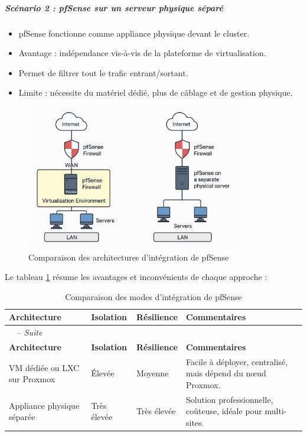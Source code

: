 \subparagraph{Scénario 2 : pfSense sur un serveur physique séparé}

\begin{itemize}
	\item pfSense fonctionne comme appliance physique devant le cluster.
	\item Avantage : indépendance vis-à-vis de la plateforme de virtualisation.
	\item Permet de filtrer tout le trafic entrant/sortant.
	\item Limite : nécessite du matériel dédié, plus de câblage et de gestion physique.
\end{itemize}

\begin{figure}[H]
	\centering
	\includegraphics[width=0.85\textwidth]{figures/choix implementation pfsense.png}
	\caption{Comparaison des architectures d'intégration de pfSense}
\end{figure}

Le tableau \ref{tab:pfsense_arch} résume les avantages et inconvénients de chaque approche :

\begin{longtable}{|p{4.5cm}|p{3.5cm}|p{3cm}|p{3.5cm}|}
	\caption{Comparaison des modes d’intégration de pfSense}
	\label{tab:pfsense_arch}                                                                                                               \\ \hline
	\textbf{Architecture}        & \textbf{Isolation} & \textbf{Résilience} & \textbf{Commentaires}                                        \\ \hline
	\endfirsthead
	\multicolumn{4}{l}{\tablename\ \thetable\ -- \textit{Suite}}                                                                           \\ \hline
	\textbf{Architecture}        & \textbf{Isolation} & \textbf{Résilience} & \textbf{Commentaires}                                        \\ \hline
	\endhead
	\endfoot
	\hline
	\endlastfoot

	VM dédiée ou LXC sur Proxmox & Élevée             & Moyenne             & Facile à déployer, centralisé, mais dépend du nœud Proxmox.  \\ \hline
	Appliance physique séparée   & Très élevée        & Très élevée         & Solution professionnelle, coûteuse, idéale pour multi-sites. \\ \hline
\end{longtable}

